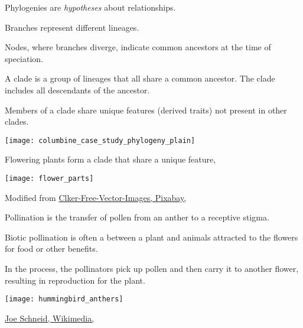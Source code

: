 \documentclass[t,hidelinks]{beamer}
\begin{document}
%
\begin{frame}[t]{Phylogenies are \emph{hypotheses} about relationships.}
	
	\begin{multicols}{2}
		\hangpara Branches represent different lineages.\vspace*{-1ex}

		\hangpara Nodes, where branches diverge, indicate common ancestors at the time of speciation.\vspace*{-1ex}

		\hangpara A clade is a group of lineages that all share a common ancestor. The clade includes all descendants of the ancestor.\vspace*{-1ex}
			
		\hangpara Members of a clade share unique features (derived traits) not present in other clades.\vspace*{-1ex} %

	\columnbreak
		
		\hfill \texttt{[image: columbine\_case\_study\_phylogeny\_plain]}
		
	\end{multicols}
\end{frame}
%
\begin{frame}[t]{Flowering plants form a clade that share a unique feature, }
	
	{\centering 
	\texttt{[image: flower\_parts]}
	}
	
	\vfilll
	
	\hfill \tiny Modified from \href{https://pixabay.com/en/diagram-flower-mature-anatomy-41571/}{Clker-Free-Vector-Images, Pixabay, \cc{}}
	
\end{frame}
%
\begin{frame}[t]{Pollination is the transfer of pollen from an anther to a receptive stigma.}

	\begin{multicols}{2}
	\hangpara Biotic pollination is often a  between a plant and animals attracted to the flowers for food or other benefits. 
	
	\hangpara In the process, the pollinators pick up pollen and then carry it to another flower, resulting in reproduction for the plant. 

	\columnbreak
	
	\texttt{[image: hummingbird\_anthers]}
	\end{multicols}
	
	\vfilll
	
	\hfill \tiny \href{https://commons.wikimedia.org/wiki/File:RubyThroatedHummingbird.jpg}{Joe Schneid, Wikimedia, } %
	
\end{frame}
\end{document}
